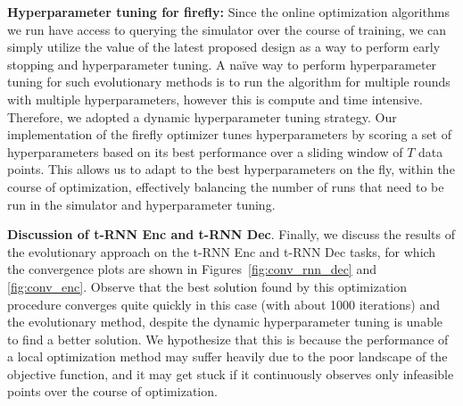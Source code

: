 {\textbf{Hyperparameter tuning for firefly:} Since the online optimization algorithms we run have access to querying the simulator over the course of training, we can simply utilize the value of the latest proposed design as a way to perform early stopping and hyperparameter tuning. A na\"ive way to perform hyperparameter tuning for such evolutionary methods is to run the algorithm for multiple rounds with multiple hyperparameters, however this is compute and time intensive. Therefore, we adopted a dynamic hyperparameter tuning strategy. Our implementation of the firefly optimizer tunes hyperparameters by scoring a set of hyperparameters based on its best performance over a sliding window of $T$ data points. This allows us to adapt to the best hyperparameters on the fly, within the course of optimization, effectively balancing the number of runs that need to be run in the simulator and hyperparameter tuning.}

{\textbf{Discussion of t-RNN Enc and t-RNN Dec}. Finally, we discuss the results of the evolutionary approach on the t-RNN Enc and t-RNN Dec tasks, for which the convergence plots are shown in Figures~\ref{fig:conv_rnn_dec} and \ref{fig:conv_enc}. Observe that the best solution found by this optimization procedure converges quite quickly in this case (with about 1000 iterations) and the evolutionary method, despite the dynamic hyperparameter tuning is unable to find a better solution. We hypothesize that this is because the performance of a local optimization method may suffer heavily due to the poor landscape of the objective function, and it may get stuck if it continuously observes only infeasible points over the course of optimization.}

